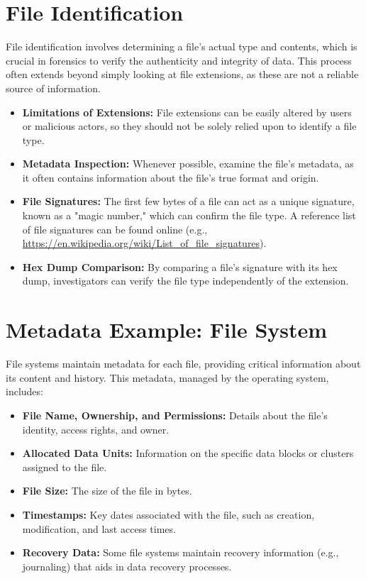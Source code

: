 \section{File Identification}

File identification involves determining a file’s actual type and contents, which is crucial in forensics to verify the authenticity and integrity of data. This process often extends beyond simply looking at file extensions, as these are not a reliable source of information.

\begin{itemize}
    \item \textbf{Limitations of Extensions:} File extensions can be easily altered by users or malicious actors, so they should not be solely relied upon to identify a file type.
    \item \textbf{Metadata Inspection:} Whenever possible, examine the file’s metadata, as it often contains information about the file’s true format and origin.
    \item \textbf{File Signatures:} The first few bytes of a file can act as a unique signature, known as a "magic number," which can confirm the file type. A reference list of file signatures can be found online (e.g., \url{https://en.wikipedia.org/wiki/List_of_file_signatures}).
    \item \textbf{Hex Dump Comparison:} By comparing a file's signature with its hex dump, investigators can verify the file type independently of the extension.
\end{itemize}

\section{Metadata Example: File System}

File systems maintain metadata for each file, providing critical information about its content and history. This metadata, managed by the operating system, includes:

\begin{itemize}
    \item \textbf{File Name, Ownership, and Permissions:} Details about the file’s identity, access rights, and owner.
    \item \textbf{Allocated Data Units:} Information on the specific data blocks or clusters assigned to the file.
    \item \textbf{File Size:} The size of the file in bytes.
    \item \textbf{Timestamps:} Key dates associated with the file, such as creation, modification, and last access times.
    \item \textbf{Recovery Data:} Some file systems maintain recovery information (e.g., journaling) that aids in data recovery processes.
\end{itemize}

